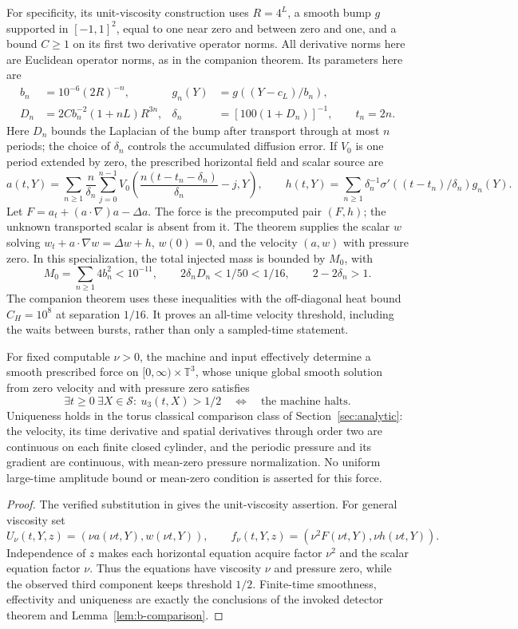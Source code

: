 For specificity, its unit-viscosity construction uses $R=4^L$, a smooth bump $g$ supported in $[-1,1]^2$, equal to one near zero and between zero and one, and a bound $C\ge1$ on its first two derivative operator norms. All derivative norms here are Euclidean operator norms, as in the companion theorem. Its parameters here are
\begin{align*}
 b_n&=10^{-6}(2R)^{-n},&g_n(Y)&=g((Y-c_L)/b_n),\\
 D_n&=2Cb_n^{-2}(1+nL)R^{3n},&\delta_n&=[100(1+D_n)]^{-1},\qquad t_n=2n.
\end{align*}
Here $D_n$ bounds the Laplacian of the bump after transport through at most $n$ periods; the choice of $\delta_n$ controls the accumulated diffusion error.
If $V_0$ is one period extended by zero, the prescribed horizontal field and scalar source are
\[
 a(t,Y)=\sum_{n\ge1}\frac n{\delta_n}\sum_{j=0}^{n-1}
 V_0\left(\frac{n(t-t_n-\delta_n)}{\delta_n}-j,Y\right),\qquad
 h(t,Y)=\sum_{n\ge1}\delta_n^{-1}\sigma'((t-t_n)/\delta_n)g_n(Y).
\]
Let $F=a_t+(a\cdot\nabla)a-\Delta a$. The force is the precomputed pair $(F,h)$; the unknown transported scalar is absent from it. The theorem supplies the scalar $w$ solving $w_t+a\cdot\nabla w=\Delta w+h$, $w(0)=0$, and the velocity $(a,w)$ with pressure zero. In this specialization, the total injected mass is bounded by $M_0$, with
\[
 M_0=\sum_{n\ge1}4b_n^2<10^{-11},\qquad
 2\delta_nD_n<1/50<1/16,\qquad 2-2\delta_n>1.
\]
The companion theorem uses these inequalities with the off-diagonal heat bound $C_H=10^8$ at separation $1/16$. It proves an all-time velocity threshold, including the waits between bursts, rather than only a sampled-time statement.

\begin{corollary}\label{bcs:expanded-eulerian}
For fixed computable $\nu>0$, the machine and input effectively determine a smooth prescribed force on $[0,\infty)\times\mathbb T^3$, whose unique global smooth solution from zero velocity and with pressure zero satisfies
\[
 \exists t\ge0\ \exists X\in\mathcal S:\ u_3(t,X)>1/2
 \quad\Longleftrightarrow\quad\text{the machine halts}.
\]
Uniqueness holds in the torus classical comparison class of Section~\ref{sec:analytic}: the velocity, its time derivative and spatial derivatives through order two are continuous on each finite closed cylinder, and the periodic pressure and its gradient are continuous, with mean-zero pressure normalization. No uniform large-time amplitude bound or mean-zero condition is asserted for this force.
\end{corollary}
\begin{proof}
The verified substitution in \cite[Theorem~3.1]{velocity2026} gives the unit-viscosity assertion. For general viscosity set
\[
 U_\nu(t,Y,z)=(\nu a(\nu t,Y),w(\nu t,Y)),\qquad
 f_\nu(t,Y,z)=(\nu^2F(\nu t,Y),\nu h(\nu t,Y)).
\]
Independence of $z$ makes each horizontal equation acquire factor $\nu^2$ and the scalar equation factor $\nu$. Thus the equations have viscosity $\nu$ and pressure zero, while the observed third component keeps threshold $1/2$. Finite-time smoothness, effectivity and uniqueness are exactly the conclusions of the invoked detector theorem and Lemma~\ref{lem:b-comparison}.
\end{proof}

